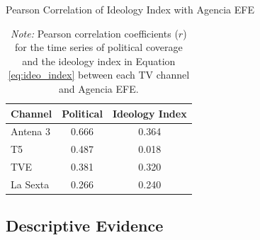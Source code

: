 \documentclass[12pt]{article}
\begin{document}
	\begin{table}[!htbp]
		\centering
		\caption{Pearson Correlation of Ideology Index  with Agencia EFE}
		\begin{tabular}{lcc}
			\toprule
			\textbf{Channel} & \textbf{Political} & \textbf{Ideology Index} \\
			\midrule
			Antena 3 & 0.666 & 0.364 \\
			T5 & 0.487 & 0.018 \\
			TVE & 0.381 & 0.320 \\
			La Sexta & 0.266 & 0.240 \\
			\bottomrule
		\end{tabular}
		\caption*{\small \textit{Note:} Pearson correlation coefficients ($r$) for the time series of political coverage and the ideology index  in Equation \ref{eq:ideo_index} between each TV channel and Agencia EFE.}
		\label{tab:correlations}
	\end{table}
	
	
	
	\subsection{Descriptive Evidence}
	
	
	
\end{document}
